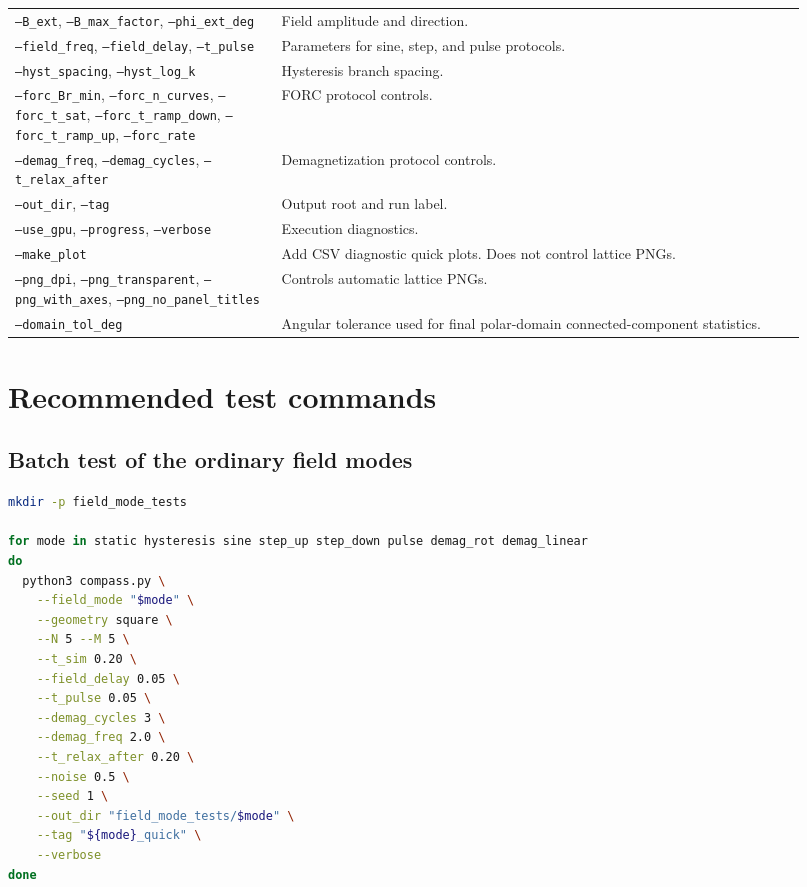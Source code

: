 \documentclass[11pt,a4paper]{article}
\newcommand{\code}[1]{\texttt{#1}}
\begin{document}
\begin{longtable}{p{0.31\linewidth}p{0.61\linewidth}}
\code{--B\_ext}, \code{--B\_max\_factor}, \code{--phi\_ext\_deg} & Field amplitude and direction. \\
\code{--field\_freq}, \code{--field\_delay}, \code{--t\_pulse} & Parameters for sine, step, and pulse protocols. \\
\code{--hyst\_spacing}, \code{--hyst\_log\_k} & Hysteresis branch spacing. \\
\code{--forc\_Br\_min}, \code{--forc\_n\_curves}, \code{--forc\_t\_sat}, \code{--forc\_t\_ramp\_down}, \code{--forc\_t\_ramp\_up}, \code{--forc\_rate} & FORC protocol controls. \\
\code{--demag\_freq}, \code{--demag\_cycles}, \code{--t\_relax\_after} & Demagnetization protocol controls. \\
\code{--out\_dir}, \code{--tag} & Output root and run label. \\
\code{--use\_gpu}, \code{--progress}, \code{--verbose} & Execution diagnostics. \\
\code{--make\_plot} & Add CSV diagnostic quick plots. Does not control lattice PNGs. \\
\code{--png\_dpi}, \code{--png\_transparent}, \code{--png\_with\_axes}, \code{--png\_no\_panel\_titles} & Controls automatic lattice PNGs. \\
\code{--domain\_tol\_deg} & Angular tolerance used for final polar-domain connected-component statistics. \\
\bottomrule
\end{longtable}

\section{Recommended test commands}
\label{sec:tests}

\subsection{Batch test of the ordinary field modes}

\begin{lstlisting}[language=bash]
mkdir -p field_mode_tests

for mode in static hysteresis sine step_up step_down pulse demag_rot demag_linear
do
  python3 compass.py \
    --field_mode "$mode" \
    --geometry square \
    --N 5 --M 5 \
    --t_sim 0.20 \
    --field_delay 0.05 \
    --t_pulse 0.05 \
    --demag_cycles 3 \
    --demag_freq 2.0 \
    --t_relax_after 0.20 \
    --noise 0.5 \
    --seed 1 \
    --out_dir "field_mode_tests/$mode" \
    --tag "${mode}_quick" \
    --verbose
done
\end{lstlisting}
\end{document}
